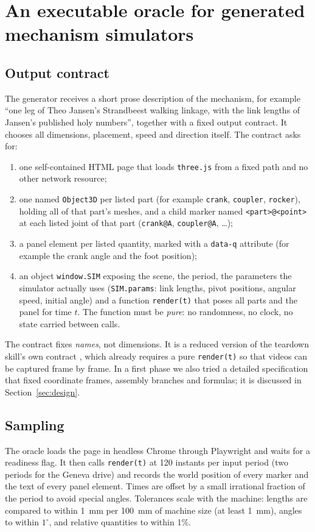 \section{An executable oracle for generated mechanism simulators}\label{sec:approach}

\subsection{Output contract}
The generator receives a short prose description of the mechanism, for example ``one leg of Theo Jansen's Strandbeest walking linkage, with the link lengths of Jansen's published holy numbers'', together with a fixed output contract. It chooses all dimensions, placement, speed and direction itself. The contract asks for:
\begin{enumerate}
\item one self-contained HTML page that loads \texttt{three.js} from a fixed path and no other network resource;
\item one named \texttt{Object3D} per listed part (for example \texttt{crank}, \texttt{coupler}, \texttt{rocker}), holding all of that part's meshes, and a child marker named \texttt{<part>@<point>} at each listed joint of that part (\texttt{crank@A}, \texttt{coupler@A}, \ldots);
\item a panel element per listed quantity, marked with a \texttt{data-q} attribute (for example the crank angle and the foot position);
\item an object \texttt{window.SIM} exposing the scene, the period, the parameters the simulator actually uses (\texttt{SIM.params}: link lengths, pivot positions, angular speed, initial angle) and a function \texttt{render(t)} that poses all parts and the panel for time $t$. The function must be \emph{pure}: no randomness, no clock, no state carried between calls.
\end{enumerate}
The contract fixes \emph{names}, not dimensions. It is a reduced version of the teardown skill's own contract \citep{teardown}, which already requires a pure \texttt{render(t)} so that videos can be captured frame by frame. In a first phase we also tried a detailed specification that fixed coordinate frames, assembly branches and formulas; it is discussed in Section~\ref{sec:design}.

\subsection{Sampling}
The oracle loads the page in headless Chrome through Playwright and waits for a readiness flag. It then calls \texttt{render(t)} at 120 instants per input period (two periods for the Geneva drive) and records the world position of every marker and the text of every panel element. Times are offset by a small irrational fraction of the period to avoid special angles. Tolerances scale with the machine: lengths are compared to within 1~mm per 100~mm of machine size (at least 1~mm), angles to within $1^\circ$, and relative quantities to within 1\%.

